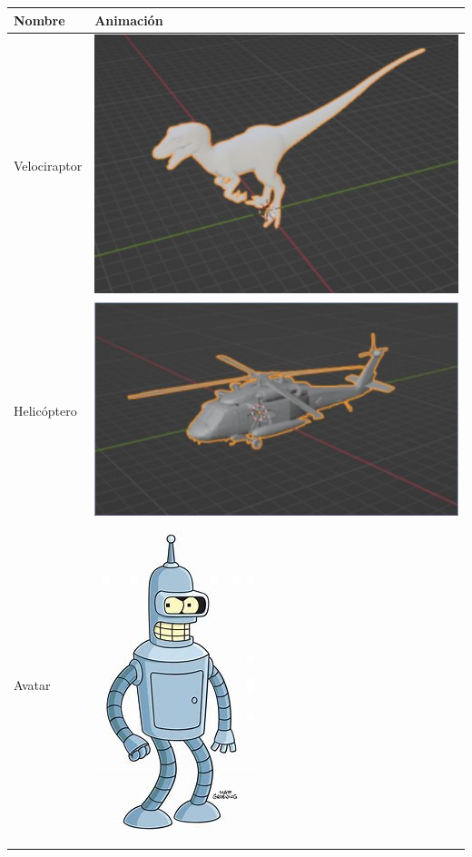 \documentclass[12pt]{article} %
\begin{document}
	\begin{center}
		\begin{tabular}{ | m{19em} | m{19em} | }
			\hline
			\rowcolor[rgb]{0.6,0.8,1.0}
			\textbf{Nombre} & \textbf{Animación}  \\  
		 	\hline
		 	\hline
		 	\rowcolor[rgb]{0.4,0.6,1.0}
		 	Velociraptor &
		 	\includegraphics[scale=0.5]{images/Velociraptor.JPG} \\  
		 	\hline
		 	\rowcolor[rgb]{0.6,0.8,1.0}
		 	Helicóptero &
		 	\includegraphics[scale=0.5]{images/Helicoptero.JPG} \\  
			\hline
			\rowcolor[rgb]{0.4,0.6,1.0}
		 	Avatar &
		 	\includegraphics [scale=0.5]{ images/Avatar.JPG} \\  

\end{tabular}
\end{center}
\end{document}
